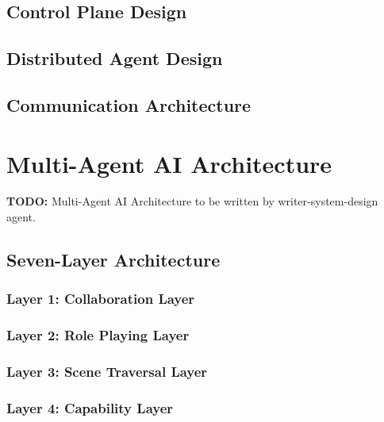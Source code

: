 \documentclass[10pt,journal,compsoc]{IEEEtran}
\begin{document}
\subsection{Control Plane Design}
\label{subsec:control-plane}

\subsection{Distributed Agent Design}
\label{subsec:agent-design}

\subsection{Communication Architecture}
\label{subsec:communication}

\section{Multi-Agent AI Architecture}
\label{sec:ai-architecture}
\textbf{TODO:} Multi-Agent AI Architecture to be written by writer-system-design agent.

\subsection{Seven-Layer Architecture}
\label{subsec:seven-layer}

\subsubsection{Layer 1: Collaboration Layer}
\label{subsubsec:layer1}

\subsubsection{Layer 2: Role Playing Layer}
\label{subsubsec:layer2}

\subsubsection{Layer 3: Scene Traversal Layer}
\label{subsubsec:layer3}

\subsubsection{Layer 4: Capability Layer}
\label{subsubsec:layer4}
\end{document}
